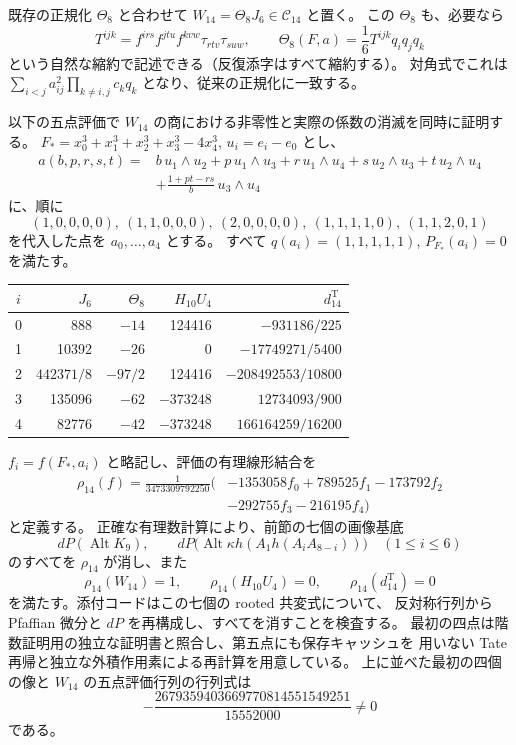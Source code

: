 既存の正規化 \(\Theta_8\) と合わせて
\(W_{14}=\Theta_8J_6\in\mathcal C_{14}\) と置く。
この \(\Theta_8\) も、必要なら
\[
 T^{ijk}=f^{irs}f^{jtu}f^{kvw}\tau_{rtv}\tau_{suw},\qquad
 \Theta_8(F,a)=\frac16 T^{ijk}q_iq_jq_k
\]
という自然な縮約で記述できる（反復添字はすべて縮約する）。
対角式でこれは
\(\sum_{i<j}a_{ij}^2\prod_{k\ne i,j}c_kq_k\) となり、従来の正規化に一致する。

以下の五点評価で \(W_{14}\) の商における非零性と実際の係数の消滅を同時に証明する。
\(F_*=x_0^3+x_1^3+x_2^3+x_3^3-4x_4^3\), \(u_i=e_i-e_0\) とし、
\[
\begin{split}
 a(b,p,r,s,t)={}&b\,u_1\wedge u_2+p\,u_1\wedge u_3
       +r\,u_1\wedge u_4+s\,u_2\wedge u_3+t\,u_2\wedge u_4\\
 &+\frac{1+pt-rs}{b}\,u_3\wedge u_4
\end{split}
\]
に、順に
\[
 (1,0,0,0,0),\ (1,1,0,0,0),\ (2,0,0,0,0),\
 (1,1,1,1,0),\ (1,1,2,0,1)
\]
を代入した点を \(a_0,\ldots,a_4\) とする。
すべて \(q(a_i)=(1,1,1,1,1)\), \(P_{F_*}(a_i)=0\) を満たす。
\begin{center}
\begin{tabular}{c|r|r|r|r}
\(i\)&\(J_6\)&\(\Theta_8\)&\(H_{10}U_4\)&\(d^{\mathrm T}_{14}\)\\\hline
0&888&\(-14\)&124416&\(-931186/225\)\\
1&10392&\(-26\)&0&\(-17749271/5400\)\\
2&\(442371/8\)&\(-97/2\)&124416&\(-208492553/10800\)\\
3&135096&\(-62\)&\(-373248\)&\(12734093/900\)\\
4&82776&\(-42\)&\(-373248\)&\(166164259/16200\)
\end{tabular}
\end{center}
\(f_i=f(F_*,a_i)\) と略記し、評価の有理線形結合を
\begin{equation}\label{eq:v11-rho-fourteen}
 \begin{split}
 \rho_{14}(f)=\frac{1}{3473309792250}\bigl(&-1353058 f_0+789525 f_1
                  -173792 f_2\\
                  &-292755 f_3-216195 f_4\bigr)
 \end{split}
\end{equation}
と定義する。
正確な有理数計算により、前節の七個の画像基底
\[
 dP(\operatorname{Alt}K_9),\qquad
 dP\bigl(\operatorname{Alt}\kappa h(A_1h(A_iA_{8-i}))\bigr)
 \quad(1\leq i\leq6)
\]
のすべてを \(\rho_{14}\) が消し、また
\begin{equation}\label{eq:v11-rho-fourteen-values}
 \rho_{14}(W_{14})=1,\qquad
 \rho_{14}(H_{10}U_4)=0,\qquad
 \rho_{14}(d^{\mathrm T}_{14})=0
\end{equation}
を満たす。添付コードはこの七個の rooted 共変式について、
反対称行列から Pfaffian 微分と \(dP\) を再構成し、すべてを消すことを検査する。
最初の四点は階数証明用の独立な証明書と照合し、第五点にも保存キャッシュを
用いない Tate 再帰と独立な外積作用素による再計算を用意している。
上に並べた最初の四個の像と \(W_{14}\) の五点評価行列の行列式は
\[
 -\frac{2679359403669770814551549251}{15552000}\ne0
\]
である。

